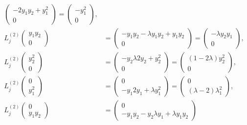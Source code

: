 \documentclass[12pt]{report}
\begin{document}
\begin{solution}
\begin{align*}
\begin{pmatrix}
            -2y_1y_2 + y_1^2\\0
        \end{pmatrix} = \begin{pmatrix}
            -y_1^2\\0
        \end{pmatrix},\\
        L_j^{(2)} \begin{pmatrix}
            y_1y_2 \\ 0
        \end{pmatrix} &= \begin{pmatrix}
            -y_1y_2 - \lambda y_1 y_2 + y_1 y_2\\0
        \end{pmatrix} = \begin{pmatrix}
            -\lambda y_2 y_1 \\ 0
        \end{pmatrix},\\
        L_j^{(2)} \begin{pmatrix}
            y_2^2 \\ 0
        \end{pmatrix} &= \begin{pmatrix}
            -y_2 \lambda 2 y_2 + y_2^2\\0
        \end{pmatrix} = \begin{pmatrix}
            (1 - 2\lambda)y_2^2\\0
        \end{pmatrix},\\
        L_j^{(2)} \begin{pmatrix}
            0 \\ y_1^2
        \end{pmatrix} &= \begin{pmatrix}
            0\\-y_1 2y_1 + \lambda y_1^2
        \end{pmatrix} = \begin{pmatrix}
            0\\(\lambda - 2)\lambda_1^2
        \end{pmatrix},\\
        L_j^{(2)} \begin{pmatrix}
            0 \\ y_1y_2
        \end{pmatrix} &= \begin{pmatrix}
            0 \\ -y_1y_2 - y_2 \lambda y_1 + \lambda y_1 y_2

\end{pmatrix}
\end{align*}
\end{solution}
\end{document}
